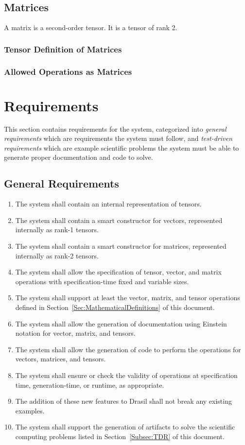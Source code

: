 \documentclass[12pt]{article}
\begin{document}
\subsection{Matrices}
A matrix is a second-order tensor. It is a tensor of rank 2.

\subsubsection{Tensor Definition of Matrices}

\subsubsection{Allowed Operations as Matrices}


\section{Requirements}\label{Sec:Req}
This section contains requirements for the system, categorized into
\textit{general requirements} which are requirements the system must
follow, and \textit{test-driven requirements} which are example scientific
problems the system must be able to generate proper documentation and 
code to solve.

\subsection{General Requirements}

\begin{enumerate}[label={R\arabic*.}]
\item The system shall contain an internal representation of tensors.
\item The system shall contain a smart constructor for vectors, represented
      internally as rank-1 tensors.
\item The system shall contain a smart constructor for matrices, represented
      internally as rank-2 tensors.
\item The system shall allow the specification of tensor, vector, and
      matrix operations with specification-time fixed and variable sizes.
\item The system shall support at least the vector, matrix, and tensor operations
      defined in Section~\ref{Sec:MathematicalDefinitions} of this document.
\item The system shall allow the generation of documentation using Einstein
      notation for vector, matrix, and tensors.
\item The system shall allow the generation of code to perform the operations
      for vectors, matrices, and tensors.
\item The system shall ensure or check the validity of operations at specification 
      time, generation-time, or runtime, as appropriate.
\item The addition of these new features to Drasil shall not break any existing
      examples.
\item The system shall support the generation of artifacts to solve the scientific
      computing problems listed in Section~\ref{Subsec:TDR} of this document.
\end{enumerate}
\end{document}
